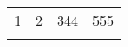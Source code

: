 \begin{myenv}
	\begin{tabular}{@{}*{2}{c}@{}}
		1 & 2 & 344 & 555 \\
		  &   &     &\end{tabular}
\end{myenv}
